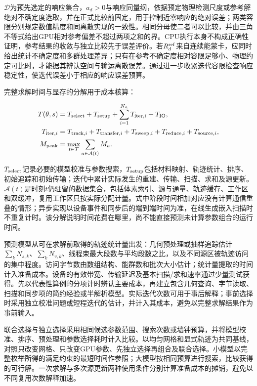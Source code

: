 \documentclass[UTF8, zihao=-4, fontset=none, a4paper]{ctexart}
\begin{document}
\(\mathcal D\)为预先选定的响应集合，\(a_d>0\)与响应同量纲，依据预定物理检测尺度或参考解绝对不确定度选取，并在正式比较前固定，用于控制近零响应的绝对误差；两类容限分别规定数值精度和同离散实现的一致性。相同分母使二者可以比较，并由三角不等式给出GPU相对参考偏差不超过两项之和的界。CPU执行本身不构成正确性证明，参考结果的收敛与独立比较先于误差评价。若\(R_d^{\rm ref}\)来自连续能蒙卡，应同时给出统计不确定度和多群处理差异；只有在参考不确定度相对容限足够小、物理约定可比时，才能据其辨认空间与输运离散误差。通过进一步收紧迭代容限检查响应稳定性，使迭代误差小于相应的响应误差预算。

完整求解时间与显存的分解用于成本核算：

\begin{equation}
\begin{aligned}
T(\theta,s)&=T_{\rm select}+T_{\rm setup}+\sum_{i=1}^{N_{\rm it}}T_{{\rm iter},i}+T_{\rm IO},\\
T_{{\rm iter},i}&=T_{{\rm track},i}+T_{{\rm transfer},i}+T_{{\rm sweep},i}
 +T_{{\rm reduce},i}+T_{{\rm source},i},\\
M_{\rm peak}&=\max_{t\in\mathcal T}\sum_{a\in\mathcal A(t)}M_a.
\end{aligned}
\label{eq:cost}
\end{equation}

\(T_{\rm select}\)记录必要的模型校准与参数搜索，\(T_{\rm setup}\)包括材料映射、轨迹统计、排序、初始追踪和初始传输；迭代中累计实际发生的重建、传输、扫描、求和及源更新。\(\mathcal A(t)\)是时刻\(t\)仍驻留的数据集合，包括体素索引、源与通量、轨迹缓存、工作区和双缓冲，复用工作区只按实际分配计量。式中阶段时间相加对应没有计算通信重叠的情形；异步实现以设备事件和同步后的端到端时间为准，在线生成嵌入扫描时不重复计时。该分解说明时间花费在哪里，尚不能直接预测未计算参数组合的运行时间。

预测模型从可在求解前取得的轨迹统计量出发：几何预处理或抽样追踪估计\(\sum_kN_{s,k}\)、\(\sum_kN_{v,k}\)、线程束最大段数与平均段数之比，以及不同源区被轨迹访问的集中程度。访问字节数由数组结构、能群数和批次大小估计；统计量提取的时间计入准备成本。设备的有效带宽、传输延迟及基本扫描/求和速率通过少量测试获得。先以代表性算例的分项计时辨认主要成本，再建立包含几何查询、字节读取、扫描和同步项的简约经验或半解析模型。实际迭代次数可用于事后解释；事前选择时采用独立校准问题或短程迭代的估计，并计入其成本，避免以完整求解结果作为事前输入。

联合选择与独立选择采用相同候选参数范围、搜索次数或墙钟预算，并将模型校准、排序、预处理和参数选择耗时计入比较。以均匀网格和显式轨迹为共同基线，对照只改变网格、只改变GPU参数、先独立选择再组合及联合选择。小模型以完整枚举所得的满足约束的最短时间作参照；大模型按相同预算进行搜索，比较获得的可行解。一次求解与多次源更新两种使用条件分别计算准备成本的摊销，避免以不同复用次数解释加速。
\end{document}
